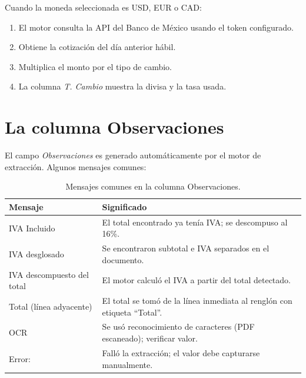 \documentclass[12pt, a4paper, oneside]{report}
\newcommand{\btn}[1]{\texttt{\colorbox{vino!15}{\strut#1}}}
\newcommand{\campo}[1]{\textit{#1}}
\begin{document}
Cuando la moneda seleccionada es USD, EUR o CAD:

\begin{enumerate}
  \item El motor consulta la API del Banco de México usando el token configurado.
  \item Obtiene la cotización del día anterior hábil.
  \item Multiplica el monto por el tipo de cambio.
  \item La columna \campo{T. Cambio} muestra la divisa y la tasa usada.
\end{enumerate}


\section{La columna Observaciones}

El campo \campo{Observaciones} es generado automáticamente por el motor de
extracción. Algunos mensajes comunes:

\begin{table}[H]
  \centering
  \begin{tabularx}{\linewidth}{lX}
    \toprule
    \textbf{Mensaje} & \textbf{Significado} \\
    \midrule
    IVA Incluido             & El total encontrado ya tenía IVA; se descompuso al 16\%. \\
    IVA desglosado           & Se encontraron subtotal e IVA separados en el documento. \\
    IVA descompuesto del total & El motor calculó el IVA a partir del total detectado. \\
    Total (línea adyacente)  & El total se tomó de la línea inmediata al renglón con etiqueta ``Total''. \\
    OCR                    & Se usó reconocimiento de caracteres (PDF escaneado); verificar valor. \\
    Error:                   & Falló la extracción; el valor debe capturarse manualmente. \\
    \bottomrule
  \end{tabularx}
  \caption{Mensajes comunes en la columna Observaciones.}
\end{table}
\end{document}
